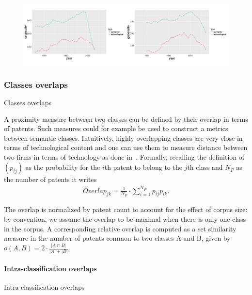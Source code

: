 \begin{figure}
\includegraphics[width=\linewidth]{Figures/Final/C-patentsmining-orig-gene.jpg}
\label{fig:patentsmining:orig-gene}
\end{figure}

\subsubsection*{Classes overlaps}{Classes overlaps} \label{subsec:overlaps}

A proximity measure between two classes can be defined by their overlap in terms of patents. 
Such measures could for example be used to construct a metrics between semantic classes. Intuitively, highly overlapping classes are very close in terms of technological content and one can use them to measure distance between two firms in terms of technology as done in~\cite{Bloom2005distance}. Formally, recalling the definition of $\left(p_{ij}\right)$ as the probability for the $i$th patent to belong to the $j$th class and $N_P$ as the number of patents it writes 
\begin{eqnarray}
\label{overlap}
Overlap_{jk} = \frac{1}{N_P}\cdot \sum_{i=1}^{N_P} p_{ij} p_{ik}. 
\end{eqnarray}

The overlap is normalized by patent count to account for the effect of corpus size: by convention, we assume the overlap to be maximal when there is only one class in the corpus. A corresponding relative overlap is computed as a set similarity measure in the number of patents common to two classes A and B, given by $o(A,B)=2\cdot \frac{\left|A\cap B\right|}{\left|A\right| + \left|B\right|}$.


\paragraph{Intra-classification overlaps}{Intra-classification overlaps}

